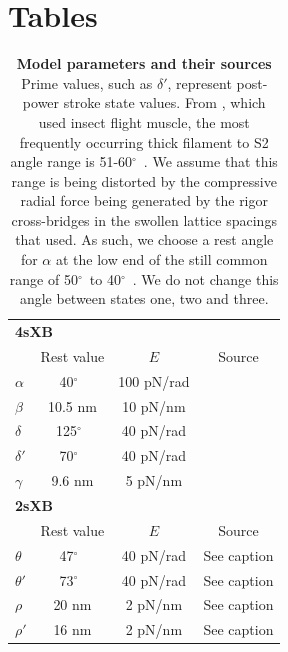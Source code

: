 \documentclass[10pt]{article}
\newcommand{\citet}[1]{\cite{#1}}
\newcommand{\de}{$^\circ$~} %
\begin{document}


\section*{Tables} %

\begin{table}[ht]
    \begin{center}
    \begin{tabular}[t]{|l|ccc|} \hline
    \multicolumn{4}{|l|}{\textbf{4sXB}} \\ 
    \multicolumn{1}{|l}{~} 
              & Rest value & $E$        & Source \\ \cline{2-4}  
    $\alpha$  & 40\de      & 100 pN/rad & \citet{Liu2006}      \\
    $\beta$   & 10.5 nm    & 10 pN/nm   & \citet{Liu2006}      \\
    $\delta$  & 125\de     & 40 pN/rad  & \citet{Taylor1999}   \\
    $\delta'$ & 70\de      & 40 pN/rad  & \citet{Taylor1999}   \\
    $\gamma$  & 9.6 nm     & 5 pN/nm    & \citet{Houdusse2000} \\ \hline
    \multicolumn{4}{|l|}{\textbf{2sXB}} \\ 
    \multicolumn{1}{|l}{~} 
              & Rest value & $E$        & Source      \\ \cline{2-4} 
    $\theta$  & 47\de      & 40 pN/rad  & See caption \\
    $\theta'$ & 73\de      & 40 pN/rad  & See caption \\
    $\rho$    & 20 nm      & 2 pN/nm    & See caption \\
    $\rho'$   & 16 nm      & 2 pN/nm    & See caption \\ \hline
    \end{tabular}
    \caption{ 
	    \label{parameter_table}
	    \textbf{Model parameters and their sources} 
	    Prime values, such as $\delta'$, represent post-power stroke state values. 
	    From \citet{Liu2006}, which used insect flight muscle, the most frequently occurring thick filament to S2 angle range is 51-60\de. 
	    We assume that this range is being distorted by the compressive radial force being generated by the rigor cross-bridges in the swollen lattice spacings that \citet{Liu2006} used. 
	    As such, we choose a rest angle for $\alpha$ at the low end of the still common range of 50\de to 40\de. 
	    We do not change this angle between states one, two and three.
}
\end{center}
\end{table}
\end{document}
